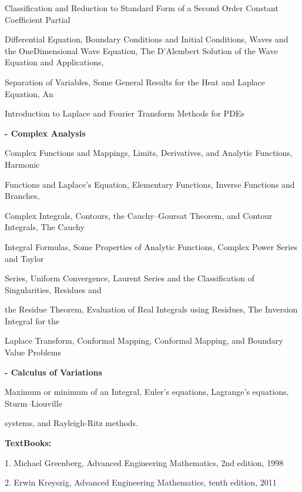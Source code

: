 \documentclass[12pt,a4paper]{article}
\begin{document}
Classiﬁcation and Reduction to Standard Form of a Second Order Constant Coefﬁcient Partial\par
Differential Equation, Boundary Conditions and Initial Conditions, Waves and the OneDimensional Wave Equation, The D’Alembert Solution of the Wave Equation and Applications,\par
Separation of Variables, Some General Results for the Heat and Laplace Equation, An\par
Introduction to Laplace and Fourier Transform Methods for PDEs\par
\vspace{2pt}\textbf{- Complex Analysis}\par
Complex Functions and Mappings, Limits, Derivatives, and Analytic Functions, Harmonic\par
Functions and Laplace’s Equation, Elementary Functions, Inverse Functions and Branches,\par
Complex Integrals, Contours, the Cauchy–Goursat Theorem, and Contour Integrals, The Cauchy\par
Integral Formulas, Some Properties of Analytic Functions, Complex Power Series and Taylor\par
Series, Uniform Convergence, Laurent Series and the Classiﬁcation of Singularities, Residues and\par
the Residue Theorem, Evaluation of Real Integrals using Residues, The Inversion Integral for the\par
Laplace Transform, Conformal Mapping, Conformal Mapping, and Boundary Value Problems\par
\vspace{2pt}\textbf{- Calculus of Variations}\par
Maximum or minimum of an Integral, Euler’s equations, Lagrange’s equations, Sturm–Liouville\par
systems, and Rayleigh-Ritz methods.\par\vspace{4pt}
\textbf{TextBooks:}\par\vspace{2pt}
1. Michael Greenberg, Advanced Engineering Mathematics, 2nd edition, 1998\par
2. Erwin Kreyszig, Advanced Engineering Mathematics, tenth edition, 2011\par
\vspace{4pt}
\end{document}
